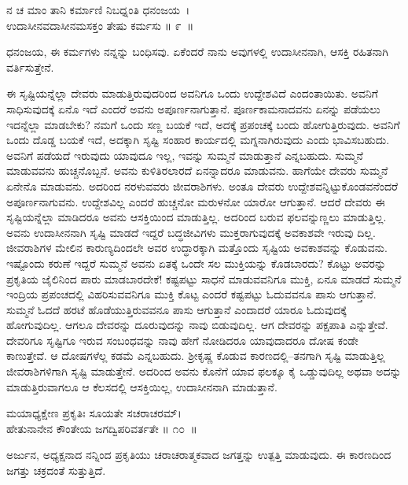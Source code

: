 \begin{shloka}
ನ ಚ ಮಾಂ ತಾನಿ ಕರ್ಮಾಣಿ ನಿಬಧ್ನಂತಿ ಧನಂಜಯ~।\\ಉದಾಸೀನವದಾಸೀನಮಸಕ್ತಂ ತೇಷು ಕರ್ಮಸು \hfill॥ ೯~॥
\end{shloka}

\begin{artha}
ಧನಂಜಯ, ಈ ಕರ್ಮಗಳು ನನ್ನನ್ನು ಬಂಧಿಸವು. ಏಕೆಂದರೆ ನಾನು ಅವುಗಳಲ್ಲಿ ಉದಾಸೀನನಾಗಿ, ಆಸಕ್ತಿ ರಹಿತನಾಗಿ ವರ್ತಿಸುತ್ತೇನೆ.
\end{artha}

\newpage

ಈ ಸೃಷ್ಟಿಯನ್ನೆಲ್ಲಾ ದೇವರು ಮಾಡುತ್ತಿರುವುದರಿಂದ ಅವನಿಗೂ ಒಂದು ಉದ್ದೇಶ\-ವಿದೆ ಎಂದಂತಾಯಿತು. ಅವನಿಗೆ ಸಾಧಿಸುವುದಕ್ಕೆ ಏನೊ ಇದೆ ಎಂದರೆ ಅವನು ಅಪೂರ್ಣನಾಗುತ್ತಾನೆ. ಪೂರ್ಣಕಾಮನಾದವನು ಏನನ್ನು ಪಡೆಯಲು ಇದನ್ನೆಲ್ಲಾ ಮಾಡಬೇಕು? ನಮಗೆ ಒಂದು ಸಣ್ಣ ಬಯಕೆ ಇದೆ, ಅದಕ್ಕೆ ಪ್ರಪಂಚಕ್ಕೆ ಬಂದು ಹೋಗುತ್ತಿರುವುದು. ಅವನಿಗೆ ಒಂದು ದೊಡ್ಡ ಬಯಕೆ ಇದೆ, ಅದಕ್ಕಾಗಿ ಸೃಷ್ಟಿ ಸಂಹಾರ ಕಾರ್ಯದಲ್ಲಿ ಮಗ್ನನಾಗಿರುವುದು ಎಂದು ಭಾವಿಸಬಹುದು. ಅವನಿಗೆ ಪಡೆಯದೆ ಇರುವುದು ಯಾವುದೂ ಇಲ್ಲ, ಇವನ್ನು ಸುಮ್ಮನೆ ಮಾಡುತ್ತಾನೆ ಎನ್ನಬಹುದು. ಸುಮ್ಮನೆ ಮಾಡುವವನು ಹುಚ್ಚನೊಬ್ಬನೆ. ಅವನು ಕುಳಿತಿರಲಾರದೆ ಏನನ್ನಾದರೂ ಮಾಡುವನು. ಹಾಗೆಯೇ ದೇವರು ಸುಮ್ಮನೆ ಏನೇನೊ ಮಾಡುವನು. ಅದರಿಂದ ನರಳುವವರು ಜೀವರಾಶಿಗಳು. ಅಂತೂ ದೇವರು ಉದ್ದೇಶವನ್ನಿಟ್ಟುಕೊಂಡವನೆಂದರೆ ಅಪೂರ್ಣನಾಗುವನು. ಉದ್ದೇಶವಿಲ್ಲ ಎಂದರೆ ಹುಚ್ಚನೋ ಮರುಳನೋ ಯಾರೋ ಆಗುತ್ತಾನೆ. ಆದರೆ ದೇವರು ಈ ಸೃಷ್ಟಿಯನ್ನೆಲ್ಲಾ ಮಾಡಿದರೂ ಅವನು ಆಸಕ್ತಿಯಿಂದ ಮಾಡುತ್ತಿಲ್ಲ. ಅದರಿಂದ ಬರುವ ಫಲವನ್ನುಣ್ಣಲು ಮಾಡುತ್ತಿಲ್ಲ. ಅವನು ಉದಾಸೀನನಾಗಿ ಸೃಷ್ಟಿ ಮಾಡದೆ ಇದ್ದರೆ ಬದ್ಧಜೀವಿಗಳು ಮುಕ್ತರಾಗುವುದಕ್ಕೆ ಅವಕಾಶವೇ ಇರುವು ದಿಲ್ಲ. ಜೀವರಾಶಿಗಳ ಮೇಲಿನ ಕಾರುಣ್ಯದಿಂದಲೇ ಅವರ ಉದ್ಧಾರಕ್ಕಾಗಿ ಮತ್ತೊಂದು ಸೃಷ್ಟಿಯ ಅವಕಾಶವನ್ನು ಕೊಡುವನು. ಇಷ್ಟೊಂದು ಕರುಣೆ ಇದ್ದರೆ ಸುಮ್ಮನೆ ಅವನು ಏತಕ್ಕೆ ಒಂದೇ ಸಲ ಮುಕ್ತಿಯನ್ನು ಕೊಡಬಾರದು? ಕೊಟ್ಟು ಅವರನ್ನು ಪ್ರಕೃತಿಯ ಜೈಲಿನಿಂದ ಪಾರು ಮಾಡಬಾರದೇಕೆ! ಕಷ್ಟಪಟ್ಟು ಸಾಧನೆ ಮಾಡುವವನಿಗೂ ಮುಕ್ತಿ, ಏನೂ ಮಾಡದೆ ಸುಮ್ಮನೆ ಇಂದ್ರಿಯ ಪ್ರಪಂಚದಲ್ಲಿ ವಿಹರಿಸುವವನಿಗೂ ಮುಕ್ತಿ ಕೊಟ್ಟ ಎಂದರೆ ಕಷ್ಟಪಟ್ಟು ಓದುವವನೂ ಪಾಸು ಆಗುತ್ತಾನೆ. ಸುಮ್ಮನೆ ಓದದೆ ಹರಟೆ ಹೊಡೆಯುತ್ತಿರುವವನೂ ಪಾಸು ಆಗುತ್ತಾನೆ ಎಂದಾದರೆ ಯಾರೂ ಓದುವುದಕ್ಕೆ ಹೋಗುವುದಿಲ್ಲ. ಆಗಲೂ ದೇವರನ್ನು ದೂರುವುದನ್ನು ನಾವು ಬಿಡುವುದಿಲ್ಲ. ಆಗ ದೇವರನ್ನು ಪಕ್ಷಪಾತಿ ಎನ್ನುತ್ತೇವೆ. ದೇವರಿಗೂ ಸೃಷ್ಟಿಗೂ ಇರುವ ಸಂಬಂಧವನ್ನು ನಾವು ಹೇಗೆ ನೋಡಿದರೂ ಯಾವುದಾದರೂ ದೋಷ ಕಂಡೇ ಕಾಣುತ್ತೇವೆ. ಆ ದೋಷಗಳೆಲ್ಲ ಕಡಮೆ ಎನ್ನಬಹುದು. ಶ‍್ರೀಕೃಷ್ಣ ಕೊಡುವ ಕಾರಣದಲ್ಲಿ–ತನಗಾಗಿ ಸೃಷ್ಟಿ ಮಾಡುತ್ತಿಲ್ಲ ಜೀವರಾಶಿಗಳಿಗಾಗಿ ಸೃಷ್ಟಿ ಮಾಡುತ್ತೇನೆ. ಅದರಿಂದ ಅವನು ಕೊನೆಗೆ ಯಾವ ಫಲಕ್ಕೂ ಕೈ ಒಡ್ಡುವುದಿಲ್ಲ ಅಥವಾ ಅದನ್ನು ಮಾಡುತ್ತಿರುವಾಗಲೂ ಆ ಕೆಲಸದಲ್ಲಿ ಆಸಕ್ತಿಯಿಲ್ಲ, ಉದಾಸೀನನಾಗಿ ಮಾಡುತ್ತಾನೆ.

\begin{shloka}
ಮಯಾಧ್ಯಕ್ಷೇಣ ಪ್ರಕೃತಿಃ ಸೂಯತೇ ಸಚರಾಚರಮ್​।\\ಹೇತುನಾನೇನ ಕೌಂತೇಯ ಜಗದ್ವಿಪರಿವರ್ತತೇ \hfill॥ ೧೦~॥
\end{shloka}

\begin{artha}
ಅರ್ಜುನ, ಅಧ್ಯಕ್ಷನಾದ ನನ್ನಿಂದ ಪ್ರಕೃತಿಯು ಚರಾಚರಾತ್ಮಕವಾದ ಜಗತ್ತನ್ನು ಉತ್ಪತ್ತಿ ಮಾಡುವುದು. ಈ ಕಾರಣದಿಂದ ಜಗತ್ತು ಚಕ್ರದಂತೆ ಸುತ್ತುತ್ತಿದೆ.
\end{artha}

